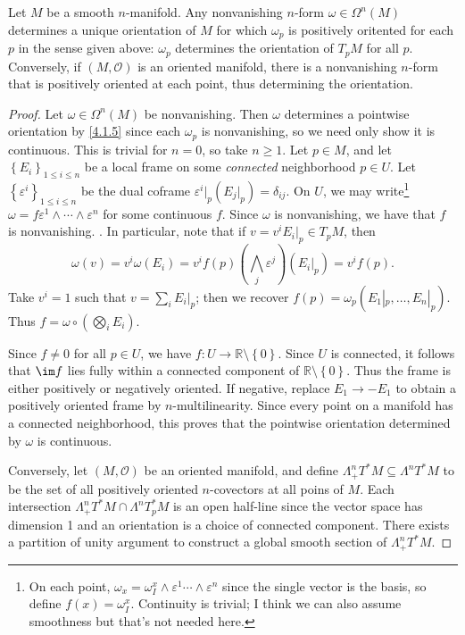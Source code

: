 \begin{proposition}\label{4.2.3}
	Let $M$ be a smooth $n$-manifold. Any nonvanishing $n$-form $\omega \in \Omega ^n(M)$ determines a unique orientation of $M$ for which $\omega_p $ is positively oritented for each $p$ in the sense given above: $\omega _p$ determines the orientation of $T_pM$ for all $p$. Conversely, if $(M,\mathcal{O} )$ is an oriented manifold, there is a nonvanishing $n$-form that is positively oriented at each point, thus determining the orientation.
\end{proposition}
\begin{proof}
	Let $\omega \in \Omega ^n(M)$ be nonvanishing. Then $\omega $ determines a pointwise orientation by \cref{4.1.5} since each $\omega _p$ is nonvanishing, so we need only show it is continuous. This is trivial for $n=0$, so take $n\geq 1$. Let $p\in M$, and let $\left\{ E_i \right\} _{1\leq i\leq n} $ be a local frame on some \emph{connected} neighborhood $p\in U$. Let $\left\{ \varepsilon ^i \right\} _{1\leq i\leq n} $ be the dual coframe $\varepsilon ^i|_p(E_j|_p)=\delta_{ij}$. On $U$, we may write\footnote{On each point, $\omega _x=\omega_I^x\wedge \varepsilon ^1\cdots \wedge \varepsilon ^n$ since the single vector is the basis, so define $f(x)=\omega _I^x$. Continuity is trivial; I think we can also assume smoothness but that's not needed here.} $\omega =f\varepsilon ^1 \wedge \cdots \wedge \varepsilon ^n$ for some continuous $f$. Since $\omega $ is nonvanishing, we have that $f$ is nonvanishing.
.
	In particular, note that if $v=v^iE_i|_p\in T_pM$, then
	\[
		\omega (v)=v^i\omega (E_i)=v^if(p)\left(\bigwedge_j\varepsilon ^j\right)(E_i|_p)=v^if(p)
	.\]
	Take $v^i=1$ such that $v=\sum_{i} E_i|_p$; then we recover $f(p)=\omega _p(E_1|_p, \ldots ,E_n|_p)$. Thus $f=\omega \circ \left(\bigotimes_{i} E_i\right)$.

	Since $f\neq 0$ for all $p\in U$, we have $f : U \to \mathbb{R} \setminus \left\{ 0 \right\} $. Since $U$ is connected, it follows that $\im f$ lies fully within a connected component of $\mathbb{R} \setminus \left\{ 0 \right\} $. Thus the frame is either positively or negatively oriented. If negative,  replace $E_1 \to -E_1$ to obtain a positively oriented frame by $n$-multilinearity. Since every point on a manifold has a connected neighborhood, this proves that the pointwise orientation determined by $\omega $ is continuous.

	Conversely, let $(M, \mathcal{O})$ be an oriented manifold, and define $\Lambda _+^nT^*M\subseteq \Lambda ^nT^*M$ to be the set of all positively oriented $n$-covectors at all poins of $M$. Each intersection $\Lambda _+^nT^*M \cap \Lambda ^nT^*_pM$ is an open half-line since the vector space has dimension 1 and an orientation is a choice of connected component. There exists a partition of unity argument to construct a global smooth section of $\Lambda _+^nT^*M$.
\end{proof}

